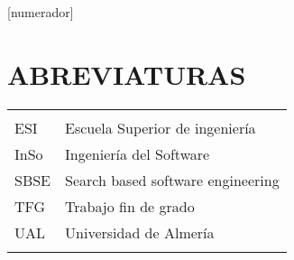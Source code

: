 

[numerador]
\setcounter{secnumdepth}{3} %
\setcounter{tocdepth}{3} %



\tableofcontents
\listoffigures %
\listoftables %
\lstlistoflistings %




\clearpage
\vspace{0.2cm}
\section*{ABREVIATURAS}

\begin{tabular}{ l   |    l  }
	

&\\
   ESI & Escuela Superior de ingeniería \\
   InSo & Ingeniería del Software \\
    SBSE& Search based software engineering\\
   TFG & Trabajo fin de grado\\
   
      UAL & Universidad de Almería \\
      &\\

\end{tabular}



